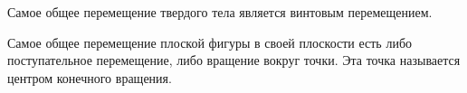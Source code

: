\begin{to_thr}
\label{thr_moz}
     Самое общее перемещение твердого тела является винтовым перемещением.
\end{to_thr}

\begin{to_con}
     Самое общее перемещение плоской фигуры в своей плоскости есть либо поступательное перемещение, либо вращение вокруг точки. Эта точка называется центром конечного вращения.
\end{to_con}